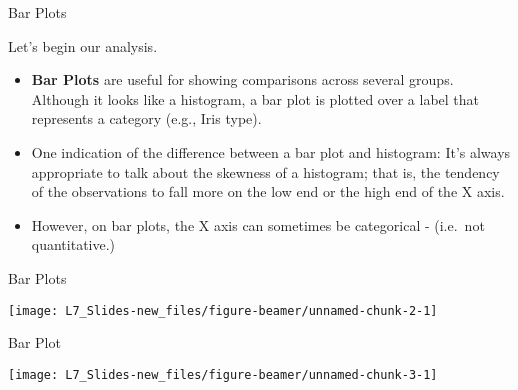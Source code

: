 \documentclass[ignorenonframetext,]{beamer}
\newenvironment{Shaded}{\begin{snugshade}}{\end{snugshade}}
\newcommand{\KeywordTok}[1]{\textcolor{white}{\textbf{{#1}}}}
\newcommand{\NormalTok}[1]{\textcolor{yellow}{{#1}}}
\newcommand{\DataTypeTok}[1]{\textcolor{yellow}{{#1}}}
\newcommand{\DecValTok}[1]{\textcolor{numbercolor}{{#1}}}
\newcommand{\StringTok}[1]{\textcolor{yellow}{{#1}}}
\begin{document}
\begin{frame}{Bar Plots}

Let's begin our analysis.

\begin{itemize}
\item
  \textbf{Bar Plots} are useful for showing comparisons across several
  groups. Although it looks like a histogram, a bar plot is plotted over
  a label that represents a category (e.g., Iris type).
\item
  One indication of the difference between a bar plot and histogram:
  It's always appropriate to talk about the skewness of a histogram;
  that is, the tendency of the observations to fall more on the low end
  or the high end of the X axis.
\item
  However, on bar plots, the X axis can sometimes be categorical -
  (i.e.~not quantitative.)
\end{itemize}

\end{frame}

\begin{frame}[fragile]{Bar Plots}

\small

\begin{Shaded}
\end{Shaded}

\begin{center}\texttt{[image: L7\_Slides-new\_files/figure-beamer/unnamed-chunk-2-1]} \end{center}

\end{frame}

\begin{frame}[fragile]{Bar Plot}

\small

\begin{Shaded}
\end{Shaded}

\begin{center}\texttt{[image: L7\_Slides-new\_files/figure-beamer/unnamed-chunk-3-1]} \end{center}

\end{frame}
\end{document}
